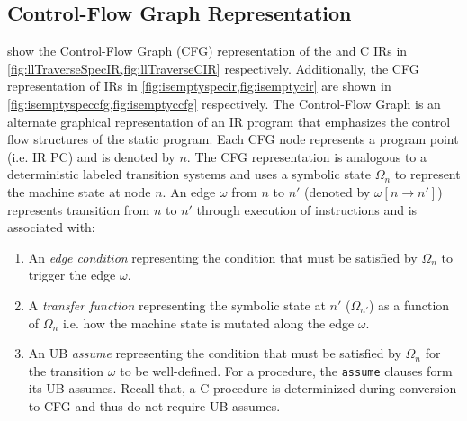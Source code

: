 \subsection{Control-Flow Graph Representation}
\label{sec:cfg}
 show the Control-Flow Graph (CFG) representation
of the \SpecL{} and C IRs in \cref{fig:llTraverseSpecIR,fig:llTraverseCIR} respectively.
Additionally, the CFG representation of IRs in \cref{fig:isemptyspecir,fig:isemptycir} are
shown in \cref{fig:isemptyspeccfg,fig:isemptyccfg} respectively.
The Control-Flow Graph is an alternate graphical representation of an IR program that emphasizes
the control flow structures of the static program.
Each CFG node represents a program point (i.e. IR PC) and is denoted by $n$.
The CFG representation is analogous to a deterministic labeled transition systems and
uses a symbolic state $\Omega_n$ to represent the machine state at node $n$.
An edge $\omega$ from $n$ to $n'$ (denoted by $\omega[n \rightarrow n']$) represents transition
from $n$ to $n'$ through execution of instructions and is associated with:
\begin{enumerate}
\item An {\em edge condition} representing the condition that must be satisfied by $\Omega_n$
to trigger the edge $\omega$.
\item A {\em transfer function} representing the symbolic state at $n'$ ($\Omega_{n'}$) as a function of $\Omega_n$
i.e. how the machine state is mutated along the edge $\omega$.
\item An UB {\em assume} representing the condition that must be satisfied by $\Omega_n$ for
the transition $\omega$ to be well-defined.
For a \SpecL{} procedure, the {\tt assume} clauses form its UB assumes.
Recall that, a C procedure is determinized during conversion to CFG and thus do not require UB assumes.
\end{enumerate}

